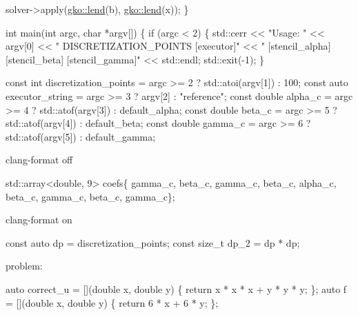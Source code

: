 \begin{DoxyCode}
    solver->apply(\hyperlink{namespacegko_aa8cb4876b72e5e1036ea9575443c439b}{gko::lend}(b), \hyperlink{namespacegko_aa8cb4876b72e5e1036ea9575443c439b}{gko::lend}(x));
\}


\textcolor{keywordtype}{int} main(\textcolor{keywordtype}{int} argc, \textcolor{keywordtype}{char} *argv[])
\{
    \textcolor{keywordflow}{if} (argc < 2) \{
        std::cerr << \textcolor{stringliteral}{"Usage: "} << argv[0] << \textcolor{stringliteral}{" DISCRETIZATION\_POINTS [executor]"}
                  << \textcolor{stringliteral}{" [stencil\_alpha] [stencil\_beta] [stencil\_gamma]"}
                  << std::endl;
        std::exit(-1);
    \}

    \textcolor{keyword}{const} \textcolor{keywordtype}{int} discretization\_points = argc >= 2 ? std::atoi(argv[1]) : 100;
    \textcolor{keyword}{const} \textcolor{keyword}{auto} executor\_string = argc >= 3 ? argv[2] : \textcolor{stringliteral}{"reference"};
    \textcolor{keyword}{const} \textcolor{keywordtype}{double} alpha\_c = argc >= 4 ? std::atof(argv[3]) : default\_alpha;
    \textcolor{keyword}{const} \textcolor{keywordtype}{double} beta\_c = argc >= 5 ? std::atof(argv[4]) : default\_beta;
    \textcolor{keyword}{const} \textcolor{keywordtype}{double} gamma\_c = argc >= 6 ? std::atof(argv[5]) : default\_gamma;
\end{DoxyCode}


clang-\/format off


\begin{DoxyCode}
std::array<double, 9> coefs\{
    gamma\_c, beta\_c, gamma\_c,
    beta\_c, alpha\_c, beta\_c,
    gamma\_c, beta\_c, gamma\_c\};
\end{DoxyCode}


clang-\/format on


\begin{DoxyCode}
\textcolor{keyword}{const} \textcolor{keyword}{auto} dp = discretization\_points;
\textcolor{keyword}{const} \textcolor{keywordtype}{size\_t} dp\_2 = dp * dp;
\end{DoxyCode}


problem\+:


\begin{DoxyCode}
\textcolor{keyword}{auto} correct\_u = [](\textcolor{keywordtype}{double} x, \textcolor{keywordtype}{double} y) \{ \textcolor{keywordflow}{return} x * x * x + y * y * y; \};
\textcolor{keyword}{auto} f = [](\textcolor{keywordtype}{double} x, \textcolor{keywordtype}{double} y) \{ \textcolor{keywordflow}{return} 6 * x + 6 * y; \};
\end{DoxyCode}


